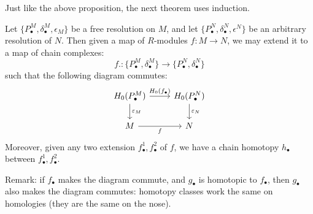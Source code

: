 Just like the above proposition, the next theorem uses induction. 
\begin{thm}
    Let $\{P_\bullet^M, \delta_\bullet^M, \epsilon_M\}$ be a free resolution on $M$, and let $\{P_\bullet^N, \delta_\bullet^N, \epsilon^N\}$ be an arbitrary resolution of $N$. Then given a map of $R$-modules $f: M\to N$, we may extend it to a map of chain complexes:
    \begin{equation*}
        f.: \{P_\bullet^M, \delta_\bullet^M\}\to \{P_\bullet^N, \delta_\bullet^N\}
    \end{equation*}
    such that the following diagram commutes:
    \[\begin{tikzcd}
        {H_0(P_\bullet^M)} & {H_0(P_\bullet^N)} \\
        M & N
        \arrow["{H_0(f_\bullet)}", from=1-1, to=1-2]
        \arrow["{\epsilon_M}", from=1-1, to=2-1]
        \arrow["{\epsilon_N}", from=1-2, to=2-2]
        \arrow["f"', from=2-1, to=2-2]
    \end{tikzcd}\]
    Moreover, given any two extension $f_\bullet^1, f_\bullet^2$ of $f$, we have a chain homotopy $h_\bullet$ between $f_\bullet^1, f_\bullet^2$.
\end{thm}
Remark: if $f_\bullet$ makes the diagram commute, and $g_\bullet$ is homotopic to $f_\bullet$, then $g_\bullet$ also makes the diagram commutes: homotopy classes work the same on homologies (they are the same on the nose).

